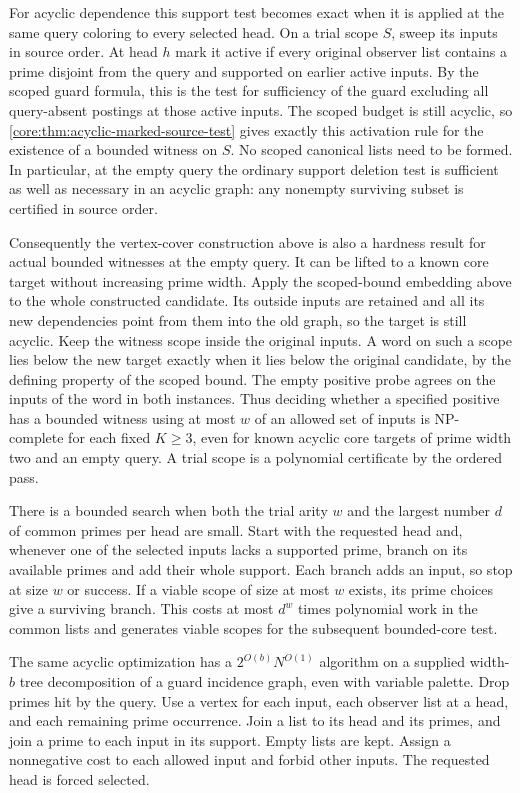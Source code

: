 For acyclic dependence this support test becomes
exact when it is applied at the same query coloring
to every selected head. On a trial scope $S$, sweep
its inputs in source order. At head $h$ mark it
active if every original observer list contains a
prime disjoint from the query and supported on
earlier active inputs. By the scoped guard formula,
this is the test for sufficiency of the guard
excluding all query-absent postings at those active
inputs. The scoped budget is still acyclic, so
\cref{core:thm:acyclic-marked-source-test} gives
exactly this activation rule for the existence of
a bounded witness on $S$. No scoped canonical
lists need to be formed. In particular, at the
empty query the ordinary support deletion test
is sufficient as well as necessary in an acyclic
graph: any nonempty surviving subset is certified
in source order.

Consequently the vertex-cover construction above
is also a hardness result for actual bounded
witnesses at the empty query. It can be lifted
to a known core target without increasing prime
width. Apply the scoped-bound embedding above
to the whole constructed candidate. Its outside
inputs are retained and all its new dependencies
point from them into the old graph, so the
target is still acyclic. Keep the witness scope
inside the original inputs. A word on such a
scope lies below the new target exactly when it
lies below the original candidate, by the defining
property of the scoped bound. The empty positive
probe agrees on the inputs of the word in both
instances. Thus deciding whether a specified
positive has a bounded witness using at most
$w$ of an allowed set of inputs is NP-complete
for each fixed $K\geq3$, even for known acyclic
core targets of prime width two and an empty
query. A trial scope is a polynomial certificate
by the ordered pass.

There is a bounded search when both the trial arity $w$
and the largest number $d$ of common primes per head are
small. Start with the requested head and, whenever one of
the selected inputs lacks a supported prime, branch on its
available primes and add their whole support. Each branch
adds an input, so stop at size $w$ or success. If a viable
scope of size at most $w$ exists, its prime choices give
a surviving branch. This costs at most $d^w$ times
polynomial work in the common lists and generates viable
scopes for the subsequent bounded-core test.

The same acyclic optimization has a
$2^{O(b)}N^{O(1)}$ algorithm on a supplied
width-$b$ tree decomposition of a guard
incidence graph, even with variable palette.
Drop primes hit by the query. Use a vertex
for each input, each observer list at a head,
and each remaining prime occurrence. Join a
list to its head and its primes, and join a
prime to each input in its support.
Empty lists are kept. Assign a nonnegative
cost to each allowed input and forbid other
inputs. The requested head is forced selected.

